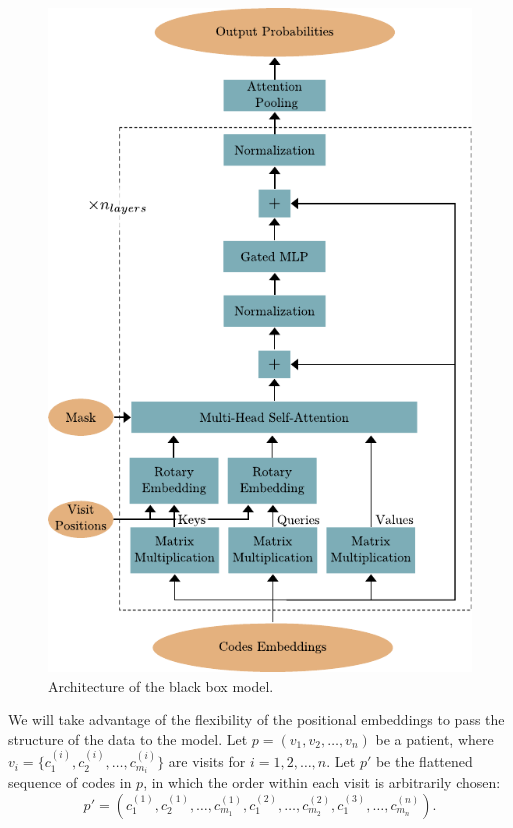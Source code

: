 \documentclass[]{marticle}
\begin{document}
\begin{figure}[!ht] 
\center
\includegraphics{kelso_architecture.pdf}
\caption{Architecture of the black box model.} 
\label{fig:kelso-architecture} 
\end{figure}

We will take advantage of the flexibility of the positional embeddings to pass the structure of the
data to the model. Let $p=(v_1, v_2, \dots, v_n)$ be a patient, where $v_i=\{c^{(i)}_1, c^{(i)}_2,
\dots, c^{(i)}_{m_i}\}$ are visits for $i=1,2,\dots, n$. Let $p'$ be the flattened sequence of codes
in $p$, in which the order within each visit is arbitrarily chosen:
\begin{equation*}
    p' = (c^{(1)}_1, c^{(1)}_2, \dots, c^{(1)}_{m_1}, c^{(2)}_1, \dots, c^{(2)}_{m_2}, c^{(3)}_1,
    \dots, c^{(n)}_{m_n}).
\end{equation*}
\end{document}
